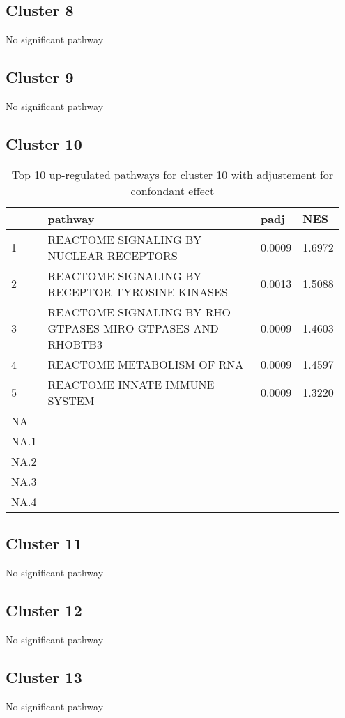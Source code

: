 \documentclass{article}
\begin{document}
\subsection{Cluster 8 }
No significant pathway
\subsection{Cluster 9 }
No significant pathway
\subsection{Cluster 10 }
\begin{table}[H]
\centering
\begin{tabular}{p{0.05\linewidth}p{0.7\linewidth}p{0.1\linewidth}p{0.1\linewidth}}
  \hline
 & pathway & padj & NES \\ 
  \hline
1 & REACTOME SIGNALING BY NUCLEAR RECEPTORS & 0.0009 & 1.6972 \\ 
  2 & REACTOME SIGNALING BY RECEPTOR TYROSINE KINASES & 0.0013 & 1.5088 \\ 
  3 & REACTOME SIGNALING BY RHO GTPASES MIRO GTPASES AND RHOBTB3 & 0.0009 & 1.4603 \\ 
  4 & REACTOME METABOLISM OF RNA & 0.0009 & 1.4597 \\ 
  5 & REACTOME INNATE IMMUNE SYSTEM & 0.0009 & 1.3220 \\ 
  NA &  &  &  \\ 
  NA.1 &  &  &  \\ 
  NA.2 &  &  &  \\ 
  NA.3 &  &  &  \\ 
  NA.4 &  &  &  \\ 
   \hline
\end{tabular}
\caption{Top 10 up-regulated pathways for cluster 10 with adjustement for confondant effect} 
\label{tab:q3_2_conf_10}
\end{table}
\subsection{Cluster 11 }
No significant pathway
\subsection{Cluster 12 }
No significant pathway
\subsection{Cluster 13 }
No significant pathway
\end{document}
